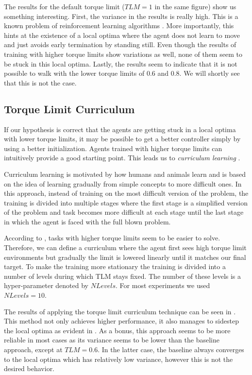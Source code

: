The results for the default torque limit ($TLM=1$ in the same figure) show us something interesting. First, the variance in the results is really high. This is a known problem of reinforcement learning algorithms \cite{rl_that_matters}. More importantly, this hints at the existence of a local optima where the agent does not learn to move and just avoids early termination by standing still. Even though the results of training with higher torque limits show variations as well, none of them seem to be stuck in this local optima. Lastly, the results seem to indicate that it is not possible to walk with the lower torque limits of 0.6 and 0.8. We will shortly see that this is not the case.

\subsection{Torque Limit Curriculum}
If our hypothesis is correct that the agents are getting stuck in a local optima with lower torque limits, it may be possible to get a better controller simply by using a better initialization. Agents trained with higher torque limits can intuitively provide a good starting point. This leads us to \textit{curriculum learning} \cite{Bengio:2009:CL:1553374.1553380}.

Curriculum learning is motivated by how humans and animals learn and is based on the idea of learning gradually from simple concepts to more difficult ones. In this approach, instead of training on the most difficult version of the problem, the training is divided into multiple stages where the first stage is a simplified version of the problem and task becomes more difficult at each stage until the last stage in which the agent is faced with the full blown problem.

According to , tasks with higher torque limits seem to be easier to solve. Therefore, we can define a curriculum where the agent first sees high torque limit environments but gradually the limit is lowered linearly until it matches our final target. To make the training more stationary the training is divided into a number of levels during which \ac{TLM} stays fixed. The number of these levels is a hyper-parameter denoted by $NLevels$. For most experiments we used $NLevels=10$.

The results of applying the torque limit curriculum technique can be seen in . This method not only achieves higher performance, it also manages to sidestep the local optima as evident in . As a bonus, this approach seems to be more reliable in most cases as its variance seems to be lower than the baseline approach, except at $TLM=0.6$. In the latter case, the baseline always converges to the local optima which has relatively low variance, however this is not the desired behavior.


